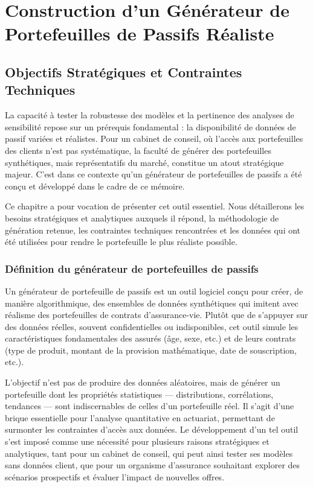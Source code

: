 \chapter{Construction d'un Générateur de Portefeuilles de Passifs Réaliste}

\section{Objectifs Stratégiques et Contraintes Techniques}
La capacité à tester la robustesse des modèles et la pertinence des analyses de sensibilité repose sur un prérequis fondamental : la disponibilité de données de passif variées et réalistes. Pour un cabinet de conseil, où l'accès aux portefeuilles des clients n'est pas systématique, la faculté de générer des portefeuilles synthétiques, mais représentatifs du marché, constitue un atout stratégique majeur. C'est dans ce contexte qu'un générateur de portefeuilles de passifs a été conçu et développé dans le cadre de ce mémoire.

Ce chapitre a pour vocation de présenter cet outil essentiel. Nous détaillerons les besoins stratégiques et analytiques auxquels il répond, la méthodologie de génération retenue, les contraintes techniques rencontrées et les données qui ont été utilisées pour rendre le portefeuille le plus réaliste possible.

\subsection{Définition du générateur de portefeuilles de passifs}
Un générateur de portefeuille de passifs est un outil logiciel conçu pour créer, de manière algorithmique, des ensembles de données synthétiques qui imitent avec réalisme des portefeuilles de contrats d'assurance-vie. Plutôt que de s'appuyer sur des données réelles, souvent confidentielles ou indisponibles, cet outil simule les caractéristiques fondamentales des assurés (âge, sexe, etc.) et de leurs contrats (type de produit, montant de la provision mathématique, date de souscription, etc.).

L'objectif n'est pas de produire des données aléatoires, mais de générer un portefeuille dont les propriétés statistiques — distributions, corrélations, tendances — sont indiscernables de celles d'un portefeuille réel. Il s'agit d'une brique essentielle pour l'analyse quantitative en actuariat, permettant de surmonter les contraintes d'accès aux données. Le développement d'un tel outil s'est imposé comme une nécessité pour plusieurs raisons stratégiques et analytiques, tant pour un cabinet de conseil, qui peut ainsi tester ses modèles sans données client, que pour un organisme d'assurance souhaitant explorer des scénarios prospectifs et évaluer l'impact de nouvelles offres.


